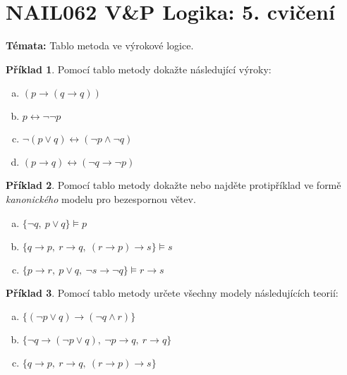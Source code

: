 \documentclass[a4paper]{article}
\theoremstyle{definition}
\newtheorem{problem}{Příklad}
\begin{document}
\section*{NAIL062 V\&P Logika: 5. cvičení}


\textbf{Témata:} 
Tablo metoda ve výrokové logice. 


\medskip\begin{problem}
    Pomocí tablo metody dokažte následující výroky:
    \begin{enumerate}[(a)]
    \item $(p\to (q \to q))$
    \item $p \leftrightarrow \neg \neg  p$
    \item $\neg (p \vee q) \leftrightarrow (\neg p \wedge \neg q)$
    \item $(p \to q) \leftrightarrow (\neg q \to \neg p)$    
    \end{enumerate}
\end{problem} 
   

\medskip\begin{problem}
    Pomocí tablo metody dokažte nebo najděte protipříklad ve formě \emph{kanonického} modelu pro bezespornou větev.
    \begin{enumerate}[(a)]
    \item $\{ \neg q,\ p \vee q\} \models p$
    \item $\{ q \to p,\ r \to q,\ (r \to p) \to s\} \models s$
    \item $\{ p \to r,\ p \vee q,\ \neg s \to \neg q\} \models r \to s$
    \end{enumerate}
\end{problem}
  

\medskip\begin{problem}
    Pomocí tablo metody určete všechny modely následujících teorií:
    \begin{enumerate}[(a)]
    \item $\{(\neg p \vee q) \to (\neg q \wedge r)\}$
    \item $\{\neg q \to (\neg p \vee q),\ \neg p \to q,\ r \to q\}$
    \item $\{ q \to p,\ r \to q,\ (r \to p) \to s\}$
    \end{enumerate}
\end{problem}
\end{document}
